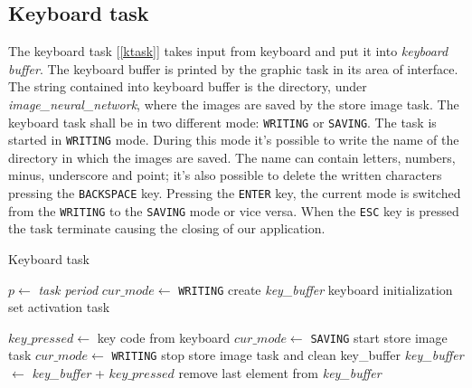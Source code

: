 \documentclass[12pt]{article}
\begin{document}
\subsection{Keyboard task}
The keyboard task [\ref{ktask}] takes input from keyboard and
put it into \textit{keyboard buffer}. The keyboard buffer is printed by the
graphic task in its area of interface. The string contained into keyboard
buffer is the directory, under \textit{image\_neural\_network}, where the
images are saved by the store image task. The keyboard task shall be in two
different mode: \texttt{WRITING} or \texttt{SAVING}. The task is started in
\texttt{WRITING} mode. During this mode it's possible to write the name of
the directory in which the images are saved. The name can contain letters,
numbers, minus, underscore and point; it's also possible to delete the written
characters pressing the \texttt{BACKSPACE} key. Pressing the
\texttt{ENTER} key, the current mode is switched from the \texttt{WRITING} to
the \texttt{SAVING} mode or vice versa. When the \texttt{ESC} key is pressed the 
task terminate causing the closing of our application.

\begin{algorithm}[t]
\caption{Keyboard task}
\label{ktask}

\begin{algorithmic}
\State $p\gets$ \textit{task period}
\State $cur\_mode\gets$ \texttt{WRITING}
\State create \textit{key\_buffer}
\State keyboard initialization
\State set activation task

\Repeat
\State $key\_pressed\gets$ key code from keyboard
    \State $cur\_mode\gets$ \texttt{SAVING}
    \State start store image task
    \Else
    \State $cur\_mode\gets$ \texttt{WRITING}
    \State stop store image task and clean key\_buffer
    \EndIf
{}
        \State \textit{key\_buffer} $\gets$ \textit{key\_buffer} + $key\_pressed$ 
        \State remove last element from \textit{key\_buffer}
    \EndIf
\EndIf


\end{algorithmic}
\end{algorithm}
\end{document}
